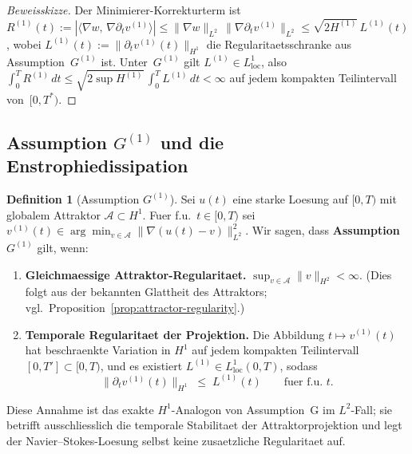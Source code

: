 \documentclass[12pt,a4paper]{article}
\theoremstyle{definition}
\newtheorem{definition}{Definition}[section]
\theoremstyle{plain}
\theoremstyle{remark}
\begin{document}
\begin{proof}[Beweisskizze]
Der Minimierer-Korrekturterm ist
$R^{(1)}(t) := |\langle \nabla w,\,
\nabla\partial_t v^{(1)}\rangle|
\le \|\nabla w\|_{L^2}\,\|\nabla\partial_t v^{(1)}\|_{L^2}
\le \sqrt{2H^{(1)}}\,L^{(1)}(t)$,
wobei $L^{(1)}(t) := \|\partial_t v^{(1)}(t)\|_{H^1}$ die
Regularitaetsschranke aus Assumption~$G^{(1)}$ ist.
Unter~$G^{(1)}$ gilt $L^{(1)} \in L^1_{\mathrm{loc}}$, also
$\int_0^T R^{(1)}\,dt
\le \sqrt{2\sup H^{(1)}}\,\int_0^T L^{(1)}\,dt < \infty$
auf jedem kompakten Teilintervall von~$[0,T^*)$.
\end{proof}

\subsection{Assumption $G^{(1)}$ und die Enstrophiedissipation}

\begin{definition}[Assumption $G^{(1)}$]\label{ass:G1}
Sei $u(t)$ eine starke Loesung auf $[0,T)$ mit globalem Attraktor
$\mathcal{A} \subset H^1$. Fuer f.u.\ $t \in [0,T)$ sei
$v^{(1)}(t) \in \arg\min_{v \in \mathcal{A}}
\|\nabla(u(t)-v)\|_{L^2}^2$.
Wir sagen, dass \textbf{Assumption~$G^{(1)}$} gilt, wenn:
\begin{enumerate}
  \item[\emph{($G^{(1)}.1$)}]
    \textbf{Gleichmaessige Attraktor-Regularitaet.}\;
    $\sup_{v \in \mathcal{A}}\|v\|_{H^2} < \infty$.
    (Dies folgt aus der bekannten Glattheit des Attraktors;
    vgl.\ Proposition~\ref{prop:attractor-regularity}.)
  \item[\emph{($G^{(1)}.2$)}]
    \textbf{Temporale Regularitaet der Projektion.}\;
    Die Abbildung $t \mapsto v^{(1)}(t)$ hat beschraenkte Variation in $H^1$
    auf jedem kompakten Teilintervall $[0,T'] \subset [0,T)$, und
    es existiert $L^{(1)} \in L^1_{\mathrm{loc}}(0,T)$, sodass
    \[
      \|\partial_t v^{(1)}(t)\|_{H^1}
      \;\le\; L^{(1)}(t)
      \qquad \text{fuer f.u.\ } t.
    \]
\end{enumerate}
Diese Annahme ist das exakte $H^1$-Analogon von Assumption~G im
$L^2$-Fall; sie betrifft ausschliesslich die temporale Stabilitaet der
Attraktorprojektion und legt der Navier--Stokes-Loesung selbst keine
zusaetzliche Regularitaet auf.
\end{definition}
\end{document}
